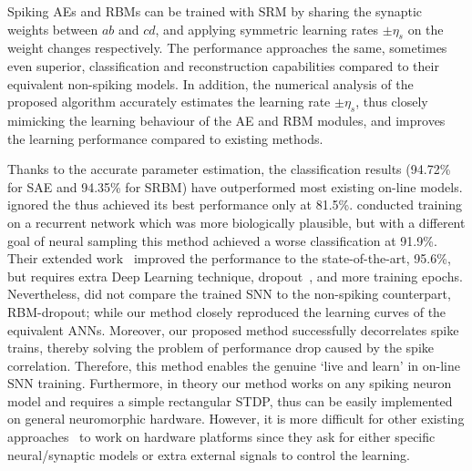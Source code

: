 Spiking AEs and RBMs can be trained with SRM by sharing the synaptic weights between $ab$ and $cd$, and applying symmetric learning rates $\pm \eta_s$ on the weight changes respectively.
The performance approaches the same, sometimes even superior, classification and reconstruction capabilities compared to their equivalent non-spiking models.
In addition, the numerical analysis of the proposed algorithm accurately estimates the learning rate $\pm \eta_s$, thus closely mimicking the learning behaviour of the AE and RBM modules, and improves the learning performance compared to existing methods.






Thanks to the accurate parameter estimation, the classification results (94.72\% for SAE and 94.35\% for SRBM) have outperformed most existing on-line models.
\citet{neil2013online} ignored the \DIFdelbegin {}\DIFdelend \DIFaddbegin {}\DIFaddend thus achieved its best performance only at 81.5\%.
\citet{neftci2013event} conducted training on a recurrent network which was more biologically plausible, but with a different goal of neural sampling this method achieved a worse classification at 91.9\%.
Their extended work~\citep{neftci2016stochastic} improved the performance to the state-of-the-art, 95.6\%, but requires extra Deep Learning technique, dropout~\citep{srivastava2014dropout}, and more training epochs.
Nevertheless, \citet{neftci2016stochastic} did not compare the trained SNN to the non-spiking counterpart, RBM-dropout; while our method closely reproduced the learning curves of the equivalent ANNs.
Moreover, our proposed method successfully decorrelates spike trains, thereby solving the problem of performance drop caused by the spike correlation.
Therefore, this method enables the genuine `live and learn' in on-line SNN training.
Furthermore, in theory our method works on any spiking neuron model and requires a simple rectangular STDP, thus can be easily implemented on general neuromorphic hardware.
However, it is more difficult for other existing approaches~\citep{neftci2013event,neftci2016stochastic} to work on hardware platforms since they ask for either specific neural/synaptic models or extra external signals to control the learning.


